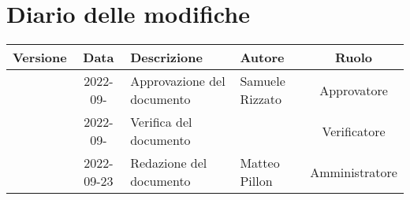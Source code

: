 \section*{Diario delle modifiche}
	\begin{center}
	\renewcommand{\arraystretch}{1.8} %
	\begin{tabular}{ |c|c|m{12em}|m{7em}|c| }
	\hline
	\textbf{Versione} & \textbf{Data} & \textbf{Descrizione} &  \textbf{Autore} &  \textbf{Ruolo} \\ %
	\hline
    & 2022-09- & Approvazione del documento & Samuele \newline Rizzato & Approvatore\\ 
	\hline
    & 2022-09- & Verifica del documento &  & Verificatore\\ 
	\hline
    & 2022-09-23 & Redazione del documento & Matteo \newline Pillon & Amministratore\\ 
	\hline
	\end{tabular}
	\end{center}
	\newpage